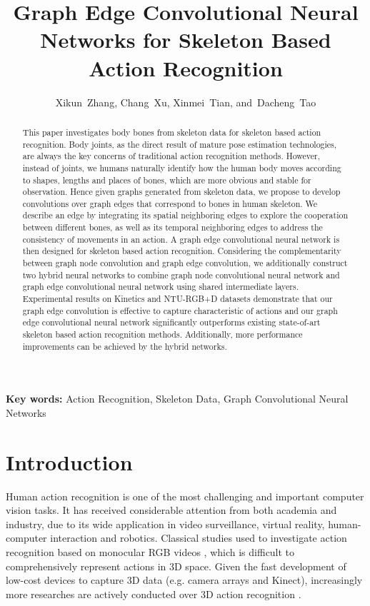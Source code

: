 \documentclass[a4paper,11pt]{article}
\begin{document}
\author{Xikun~Zhang, Chang~Xu, Xinmei~Tian, and~Dacheng~Tao}
\title{Graph Edge Convolutional Neural Networks for Skeleton Based Action Recognition}
\maketitle






\begin{abstract}
This paper investigates body bones from skeleton data for skeleton based action recognition. Body joints, as the direct result of mature pose estimation technologies, are always the key concerns of traditional action recognition methods. However, instead of joints, we humans naturally identify how the human body moves according to shapes, lengths and places of bones, which are more obvious and stable for observation.
Hence given graphs generated from skeleton data, we propose to develop convolutions over graph edges that correspond to bones in human skeleton. We describe an edge by integrating its spatial neighboring edges to explore the cooperation between different bones, as well as its temporal neighboring edges to address the consistency of movements in an action. A graph edge convolutional neural network is then designed for skeleton based action recognition. Considering the complementarity between graph node convolution and graph edge convolution, we additionally construct two hybrid neural networks to combine graph node convolutional neural network and graph edge convolutional neural network using shared intermediate layers. Experimental results on Kinetics and NTU-RGB+D datasets demonstrate that our graph edge convolution is effective to capture characteristic of actions and our graph edge convolutional neural network significantly outperforms existing state-of-art skeleton based action recognition methods. Additionally, more performance improvements can be achieved by the hybrid networks.
\end{abstract}

{\bf Key words:} Action Recognition, Skeleton Data, Graph Convolutional Neural Networks






\section{Introduction}

Human action recognition is one of the most challenging and important computer vision tasks. It has received considerable attention from both academia and industry, due to its wide application in video surveillance, virtual reality, human-computer interaction and robotics. Classical studies used to investigate action recognition based on monocular RGB videos \cite{wang2007learning,simonyan2014two,wang2011action,wang2013action,le2011learning,liu2018computational}, which is difficult to comprehensively represent actions in 3D space. Given the fast development of low-cost devices to capture 3D data (e.g. camera arrays and Kinect), increasingly more researches are actively conducted over 3D action recognition \cite{vieira2012stop,chen2016real,luo2013group,wang2012robust,yang2012eigenjoints}.
\end{document}
